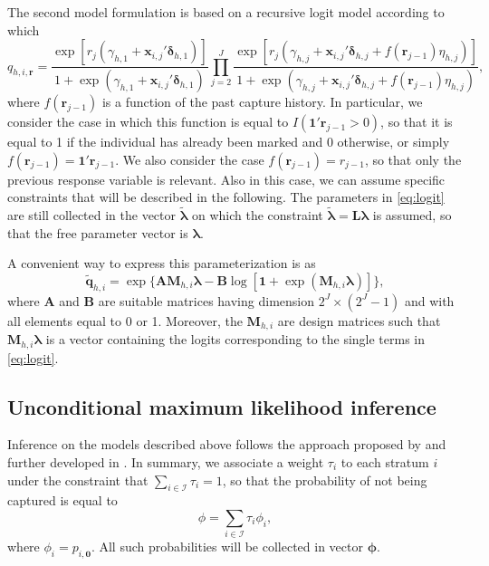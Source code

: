 The second model formulation is based on a recursive logit model according to which
\begin{equation}\label{eq:logit}
q_{h,i,\bm{r}} =\frac{\exp[r_j(\gamma_{h,1}+\bm{x}_{i,j}'\bm{\delta}_{h,1})]}{1+\exp(\gamma_{h,1}+\bm{x}_{i,j}'\bm{\delta}_{h,1})}\prod_{j=2}^J\frac{\exp[r_j(\gamma_{h,j}+\bm{x}_{i,j}'\bm{\delta}_{h,j}+f(\bm{r}_{j-1})\eta_{h,j})]}{1+\exp(\gamma_{h,j}+\bm{x}_{i,j}'\bm{\delta}_{h,j}+f(\bm{r}_{j-1})\eta_{h,j})},
\end{equation}
where $f(\bm{r}_{j-1})$ is a function of the past capture history.
In particular, we consider the case in which this function is equal to $I(\bm{1}'\bm{r}_{j-1}>0)$, so that it is equal to 1 if the individual has already been marked and 0 otherwise, or simply $f(\bm{r}_{j-1})=\bm{1}'\bm{r}_{j-1}$.
We also consider the case $f(\bm{r}_{j-1})=r_{j-1}$, so that only the previous response variable is relevant.
Also in this case, we can assume specific constraints that will be described in the following.
The parameters in \eqref{eq:logit} are still collected in the vector $\tilde{\bm{\lambda}}$ on which the constraint $\tilde{\bm{\lambda}}=\bm{L}\bm{\lambda}$ is assumed, so that the free parameter vector is $\bm{\lambda}$.

A convenient way to express this parameterization is as
\begin{equation}\label{eq:logit_matrix}
\tilde{\bm{q}}_{h,i} = \exp\{\bm{A} \bm{M}_{h,i}\bm{\lambda} - \bm{B}\log[\bm{1}+\exp(\bm{M}_{h,i}\bm{\lambda})]\},
\end{equation}
where $\bm{A}$ and $\bm{B}$ are suitable matrices having dimension $2^J\times (2^J-1)$ and with all elements equal to 0 or 1.
Moreover, the $\bm{M}_{h,i}$ are design matrices such that $\bm{M}_{h,i}\bm{\lambda}$ is a vector containing the logits corresponding to the single terms in \eqref{eq:logit}.
%
\subsection{Unconditional maximum likelihood inference}
%
Inference on the models described above follows the approach proposed by \cite{Liu2017} and further developed in \cite{bartolucci2024estimating}.
In summary, we associate a weight $\tau_i$ to each stratum $i$ under the constraint that $\sum_{i\in\mathcal{I}}\tau_i=1$, so that the probability of not being captured is equal to
\[
\phi = \sum_{i\in\mathcal{I}}\tau_i\phi_i,
\]
where $\phi_i=p_{i,\bm{0}}$.
All such probabilities will be collected in vector $\bm\phi$.

